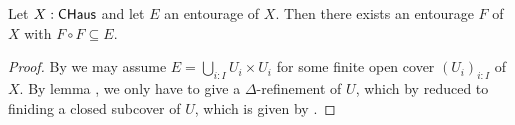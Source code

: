 \begin{theorem}[Shrinking]\label{shrinking}
  Let $X:\mathsf{CHaus}$ and let $E$ an entourage of $X$. Then there exists an entourage $F$ of $X$ with $F\circ F \subseteq E$. 
\end{theorem}
\begin{proof}
  By  we may assume $E = \bigcup_{i:I} U_i \times U_i$ for some finite open cover $(U_i)_{i:I}$ of $X$. 
  By lemma , we only have to give a $\Delta$-refinement of $U$, which by  reduced to finiding a closed subcover of $U$, which is given by .
\end{proof}

